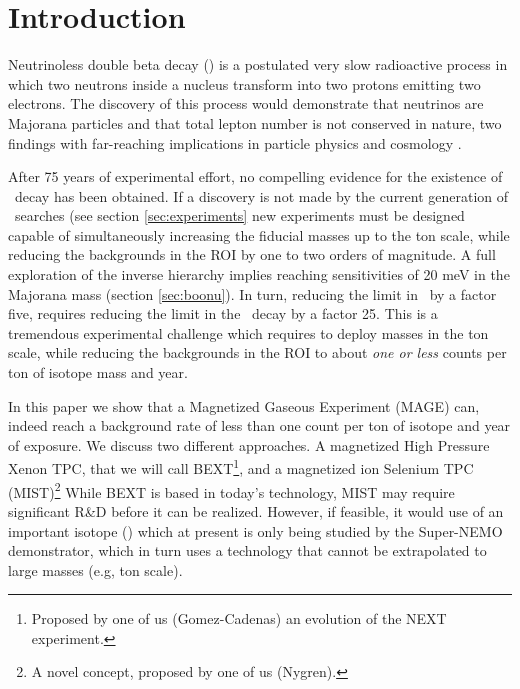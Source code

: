 \section{Introduction}\label{sec:intro}

Neutrinoless double beta decay (\bbonu) is a postulated very slow radioactive process in which two neutrons inside a nucleus transform into two protons emitting two electrons. The discovery of this process would demonstrate that neutrinos are Majorana particles and that total lepton number is not conserved in nature, two findings with far-reaching implications in particle physics and cosmology \cite{Gomez_2013,GomezCadenas:2013ue,Cadenas_2012}.

After 75 years of experimental effort, no compelling evidence for the existence of \bbonu\ decay has been obtained. If a discovery is not made by the current generation of \bbonu\ searches (see section \ref{sec:experiments} new experiments must be designed capable of simultaneously increasing the fiducial masses up to the ton scale, while reducing the backgrounds in the ROI by one to two orders of magnitude. A full exploration of the inverse hierarchy implies reaching sensitivities of 20 meV in the Majorana mass (section \ref{sec:boonu}). In turn, reducing the limit in \mbb\ by a factor five, requires reducing the limit in the \bbonu\ decay by a factor 25. This is a tremendous experimental challenge which requires to deploy masses in the ton scale, while reducing the backgrounds in the ROI to about {\em one or less} counts per ton of isotope mass and year. 

In this paper we show that a Magnetized Gaseous Experiment (MAGE) can, indeed reach a background rate of less than one count per ton of isotope and year of exposure. We discuss two different approaches. A magnetized High Pressure Xenon TPC, that we will call BEXT\footnote{Proposed by one of us (Gomez-Cadenas) an evolution of the NEXT experiment.}, and a magnetized ion Selenium TPC (MIST)\footnote{A novel concept, proposed by one of us (Nygren).} While BEXT is based in today's technology, MIST may require significant R\&D before it can be realized. However, if feasible, it would use of an important isotope (\SE) which at present is only being studied by the Super-NEMO demonstrator, which in turn uses a technology that cannot be extrapolated to large masses (e.g, ton scale). 

